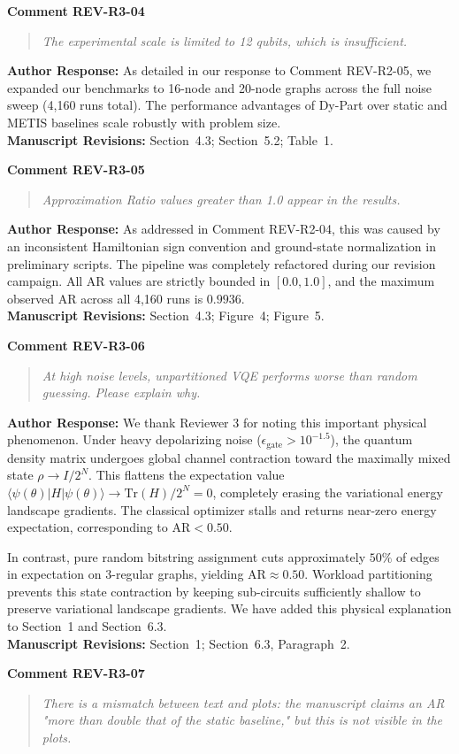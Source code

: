 \documentclass[11pt,a4paper]{article}
\newcommand{\commentbox}[2]{
    \vspace{0.8em}
    \noindent\textbf{\textcolor{commentcolor}{#1}}
    \vspace{0.2em}
    \begin{quote}
        \small\itshape #2
    \end{quote}
}
\newcommand{\responsebox}[1]{
    \noindent\textbf{\textcolor{responsecolor}{Author Response:}} #1
    \vspace{0.8em}
}
\begin{document}
\commentbox{Comment REV-R3-04}{The experimental scale is limited to 12 qubits, which is insufficient.}

\responsebox{As detailed in our response to Comment REV-R2-05, we expanded our benchmarks to 16-node and 20-node graphs across the full noise sweep (4,160 runs total). The performance advantages of Dy-Part over static and METIS baselines scale robustly with problem size.
\\[0.3em]
\textbf{Manuscript Revisions:} Section~4.3; Section~5.2; Table~1.}

\commentbox{Comment REV-R3-05}{Approximation Ratio values greater than 1.0 appear in the results.}

\responsebox{As addressed in Comment REV-R2-04, this was caused by an inconsistent Hamiltonian sign convention and ground-state normalization in preliminary scripts. The pipeline was completely refactored during our revision campaign. All AR values are strictly bounded in $[0.0, 1.0]$, and the maximum observed AR across all 4,160 runs is $0.9936$.
\\[0.3em]
\textbf{Manuscript Revisions:} Section~4.3; Figure~4; Figure~5.}

\commentbox{Comment REV-R3-06}{At high noise levels, unpartitioned VQE performs worse than random guessing. Please explain why.}

\responsebox{We thank Reviewer 3 for noting this important physical phenomenon. Under heavy depolarizing noise ($\epsilon_{\text{gate}} > 10^{-1.5}$), the quantum density matrix undergoes global channel contraction toward the maximally mixed state $\rho \to I / 2^N$. This flattens the expectation value $\langle \psi(\theta) | H | \psi(\theta) \rangle \to \mathrm{Tr}(H)/2^N = 0$, completely erasing the variational energy landscape gradients. The classical optimizer stalls and returns near-zero energy expectation, corresponding to $\text{AR} < 0.50$.

In contrast, pure random bitstring assignment cuts approximately $50\%$ of edges in expectation on 3-regular graphs, yielding $\text{AR} \approx 0.50$. Workload partitioning prevents this state contraction by keeping sub-circuits sufficiently shallow to preserve variational landscape gradients. We have added this physical explanation to Section~1 and Section~6.3.
\\[0.3em]
\textbf{Manuscript Revisions:} Section~1; Section~6.3, Paragraph~2.}

\commentbox{Comment REV-R3-07}{There is a mismatch between text and plots: the manuscript claims an AR "more than double that of the static baseline," but this is not visible in the plots.}
\end{document}
